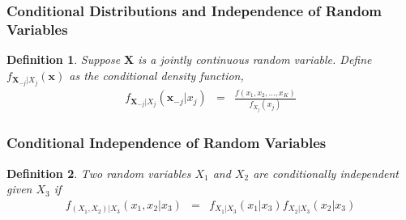 \documentclass{beamer}
\newtheorem{defn}{Definition}
\numberwithin{equation}{section}
\begin{document}
\begin{frame}
\frametitle{Conditional Distributions and Independence of Random Variables}


\begin{defn}
Suppose $\boldsymbol{X}$ is a jointly continuous random variable.  Define $f_{\boldsymbol{X}_{-j} | X_{j}} (\boldsymbol{x})$ as the conditional density function, 
\begin{eqnarray}
f_{\boldsymbol{X}_{-j} | X_{j} } (\boldsymbol{x}_{-j} | x_{j} ) & = & \frac{f(x_{1}, x_{2}, \hdots, x_{K} )}{f_{X_{j}}(x_{j} ) } \nonumber 
\end{eqnarray}

\pause 
{}

\end{defn}




\end{frame}

\begin{frame}
\frametitle{Conditional Independence of Random Variables}

\begin{defn}

Two random variables $X_{1}$ and $X_{2}$ are conditionally independent given $X_{3}$ if 
\begin{eqnarray}
f_{(X_{1}, X_{2})| X_{3} } (x_{1}, x_{2} | x_{3} ) & = & f_{X_{1}|X_{3}}(x_{1}| x_{3} ) f_{X_{2}|X_{3}}(x_{2}| x_{3} ) \nonumber 
\end{eqnarray}

\pause 


\end{defn}



\end{frame}
\end{document}
